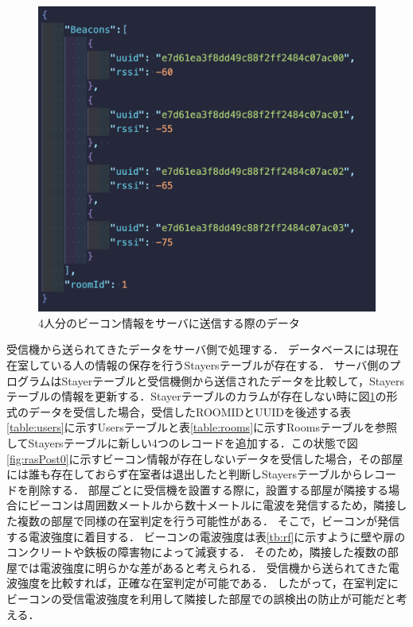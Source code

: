 \begin{figure}[H]
  \begin{center}
    \includegraphics[width=160mm]{image/rasPost4.png}
    \caption{4人分のビーコン情報をサーバに送信する際のデータ}
    \label{fig:rasPost4}
  \end{center}
\end{figure}

受信機から送られてきたデータをサーバ側で処理する．
データベースには現在在室している人の情報の保存を行うStayersテーブルが存在する．
サーバ側のプログラムはStayerテーブルと受信機側から送信されたデータを比較して，Stayersテーブルの情報を更新する．Stayerテーブルのカラムが存在しない時に図\ref{fig:rasPost4}の形式のデータを受信した場合，受信したROOMIDとUUIDを後述する表\ref{table:users}に示すUsersテーブルと表\ref{table:rooms}に示すRoomsテーブルを参照してStayersテーブルに新しい4つのレコードを追加する．この状態で図\ref{fig:rasPost0}に示すビーコン情報が存在しないデータを受信した場合，その部屋には誰も存在しておらず在室者は退出したと判断しStayersテーブルからレコードを削除する．
部屋ごとに受信機を設置する際に，設置する部屋が隣接する場合にビーコンは周囲数メートルから数十メートルに電波を発信するため，隣接した複数の部屋で同様の在室判定を行う可能性がある．
そこで，ビーコンが発信する電波強度に着目する．
ビーコンの電波強度は表\ref{tb:rf}に示すように壁や扉のコンクリートや鉄板の障害物によって減衰する\cite{barrier}．
そのため，隣接した複数の部屋では電波強度に明らかな差があると考えられる．
受信機から送られてきた電波強度を比較すれば，正確な在室判定が可能である．
したがって，在室判定にビーコンの受信電波強度を利用して隣接した部屋での誤検出の防止が可能だと考える．


